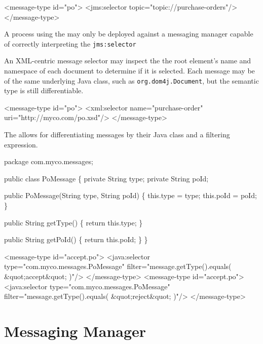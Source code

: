 \begin{codelisting}
<message-type id="po">
    <jms:selector topic="topic://purchase-orders"/>
</message-type>
\end{codelisting}

A process using the  may only be deployed
against a messaging manager capable of correctly interpreting
the \verb|jms:selector| 

An XML-centric message selector may inspect the the root
element's name and namespace of each document to determine
if it is selected.  Each message may be of the same underlying
Java class, such as \verb|org.dom4j.Document|, but the
semantic type is still differentiable.

\begin{codelisting}
<message-type id="po">
    <xml:selector name="purchase-order" uri="http://myco.com/po.xsd"/>
</message-type>
\end{codelisting}

The  allows for differentiating messages by
their Java class and a filtering expression.  

\begin{codelisting}
package com.myco.messages;

public class PoMessage
\{
    private String type;
    private String poId;

    public PoMessage(String type,
                     String poId)
    \{
        this.type = type;
        this.poId = poId;
    \}

    public String getType()
    \{
        return this.type;
    \}

    public String getPoId()
    \{
        return this.poId;
    \}
\}
\end{codelisting}

\begin{codelisting}
<message-type id="accept.po">
    <java:selector type="com.myco.messages.PoMessage"
                   filter="message.getType().equals( &quot;accept&quot; )"/>
</message-type>
<message-type id="accept.po">
    <java:selector type="com.myco.messages.PoMessage"
                   filter="message.getType().equals( &quot;reject&quot; )"/>
</message-type>
\end{codelisting}

\section{Messaging Manager}

